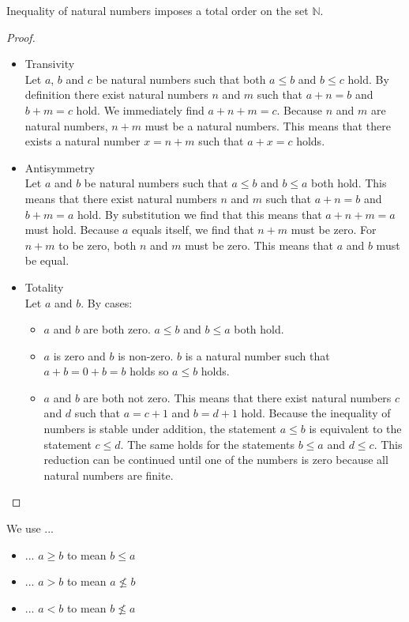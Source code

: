 \documentclass[main.tex]{subfiles}
\begin{document}
\begin{pr}
  Inequality of natural numbers imposes a total order on the set $\mathbb{N}$.

  \begin{proof}
    \noindent
    \begin{itemize}
      \item Transivity\\
        Let $a$, $b$ and $c$ be natural numbers such that both $a \le b$ and $b \le c$ hold.
        By definition there exist natural numbers $n$ and $m$ such that $a + n = b$ and $b + m = c$ hold.
        We immediately find $a + n + m = c$.
        Because $n$ and $m$ are natural numbers, $n+m$ must be a natural numbers.
        This means that there exists a natural number $x = n + m$ such that $a+x = c$ holds.
      \item Antisymmetry\\
        Let $a$ and $b$ be natural numbers such that $a \le b$ and $b \le a$ both hold.
        This means that there exist natural numbers $n$ and $m$ such that $a + n = b$ and $b + m = a$ hold.
        By substitution we find that this means that $a + n + m = a$ must hold.
        Because $a$ equals itself, we find that $n+m$ must be zero.
        For $n+m$ to be zero, both $n$ and $m$ must be zero.
        This means that $a$ and $b$ must be equal.
      \item Totality\\
        Let $a$ and $b$.
        By cases:
        \noindent
        \begin{itemize}
          \item
            $a$ and $b$ are both zero.
            $a \le b$ and $ b\le a$ both hold.
          \item
            $a$ is zero and $b$ is non-zero.
            $b$ is a natural number such that $a + b = 0 + b = b$ holds so $a \le b$ holds.
          \item
            $a$ and $b$ are both not zero.
            This means that there exist natural numbers $c$ and $d$ such that $a = c + 1$ and $b = d + 1$ hold.
            Because the inequality of numbers is stable under addition, the statement $a \le b$ is equivalent to the statement $c \le d$.
            The same holds for the statements $b \le a$ and $d \le c$.
            This reduction can be continued until one of the numbers is zero because all natural numbers are finite.
        \end{itemize}
    \end{itemize}
  \end{proof}
\end{pr}

\begin{de}
  We use ...
  \begin{itemize}
    \item ... $a \ge b$ to mean $b \le a$
    \item ... $a > b$ to mean $a \not\le b$
    \item ... $a < b$ to mean $b \not\le a$
  \end{itemize}
\end{de}

\end{document}
